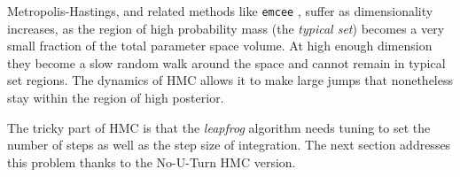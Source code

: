 \documentclass[twocolumn,twocolappendix,nofootinbib,iop]{openjournal}
\newcommand{\jaxcosmo}{\texttt{jax-cosmo}}
\begin{document}
Metropolis-Hastings, and related methods like \texttt{emcee} \citep{goodman-weare,emcee},  suffer as dimensionality increases,  as the region of high probability mass (the \textit{typical set}) becomes a very small fraction of the total parameter space volume. At high enough dimension they become a slow random walk around the space and cannot remain in typical set regions.
The dynamics of HMC allows it to make large jumps that nonetheless stay within the region of high posterior.

The tricky part of HMC is that the \textit{leapfrog} algorithm needs tuning to set the number of steps as well as the step size of integration. The next section addresses this problem thanks to the No-U-Turn HMC version.



%
%
%
%
\end{document}
